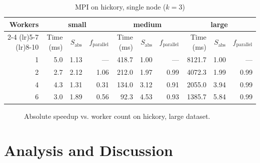 \documentclass[conference]{IEEEtran}
\begin{document}
\begin{table}[t]
\caption{MPI on hickory, single node ($k=3$)}
\label{tab:hickory-mpi}
\centering
\begin{tabular}{rrrrrrrrrr}
\toprule
Workers & \multicolumn{3}{c}{small} & \multicolumn{3}{c}{medium} & \multicolumn{3}{c}{large} \\
\cmidrule(lr){2-4} \cmidrule(lr){5-7} \cmidrule(lr){8-10}
 & Time (ms) & $S_{\text{abs}}$ & $f_{\text{parallel}}$ & Time (ms) & $S_{\text{abs}}$ & $f_{\text{parallel}}$ & Time (ms) & $S_{\text{abs}}$ & $f_{\text{parallel}}$ \\
\midrule
1 & 5.0 & 1.13 & --- & 418.7 & 1.00 & --- & 8121.7 & 1.00 & --- \\
2 & 2.7 & 2.12 & 1.06 & 212.0 & 1.97 & 0.99 & 4072.3 & 1.99 & 0.99 \\
4 & 4.3 & 1.31 & 0.31 & 134.0 & 3.12 & 0.91 & 2055.0 & 3.94 & 0.99 \\
6 & 3.0 & 1.89 & 0.56 & 92.3 & 4.53 & 0.93 & 1385.7 & 5.84 & 0.99 \\
\bottomrule
\end{tabular}
\end{table}

\begin{figure}[htbp]
\centering
{}
\caption{Absolute speedup vs. worker count on hickory, large dataset.}
\label{fig:hickory-speedup}
\end{figure}

\section{Analysis and Discussion}
\label{sec:analysis}
\end{document}
